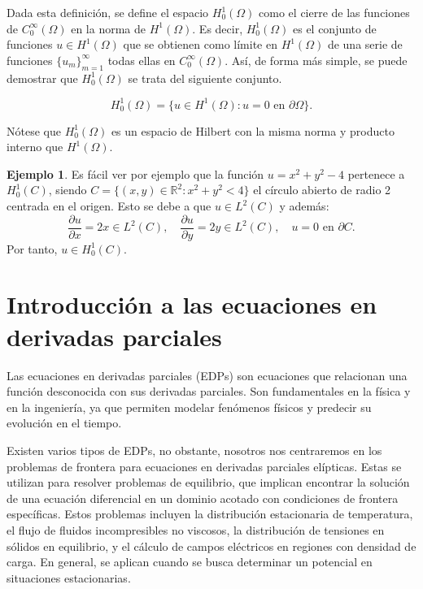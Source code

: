 \documentclass[a4paper,11pt,spanish, twoside, leqno]{tfg-uam}
\theoremstyle{definition}
\newtheorem{exmp}[teor]{Ejemplo}
\begin{document}
Dada esta definición, se define el espacio $H_0^1(\Omega)$ como el cierre de las funciones de $C_0^\infty(\Omega)$ en la norma de $H^1(\Omega)$. Es decir, $H_0^1(\Omega)$ es el conjunto de funciones $u\in H^1(\Omega)$ que se obtienen como límite en $H^1(\Omega)$ de una serie de funciones $\{u_m\}_{m=1}^\infty$ todas ellas en $C_0^\infty(\Omega)$. Así, de forma más simple, se puede demostrar que $H_0^1(\Omega)$ se trata del siguiente conjunto.

\begin{equation}
    H_0^1(\Omega)=\{u\in H^1(\Omega): u=0 \text{ en } \partial\Omega\}.
\end{equation}

Nótese que $H_0^1(\Omega)$ es un espacio de Hilbert con la misma norma y producto interno que $H^1(\Omega)$.



\begin{exmp}
    Es fácil ver por ejemplo que la función $u = x^2 + y^2 - 4$ pertenece a $H^1_0(C)$, siendo $C = \{(x,y)\in \mathbb{R}^2: x^2 + y^2 < 4\}$ el círculo abierto de radio 2 centrada en el origen. Esto se debe a que $u\in L^2(C)$ y además:
    \begin{equation*}
        \frac{\partial u}{\partial x} = 2x\in L^2(C), \quad \frac{\partial u}{\partial y} = 2y \in L^2(C), \quad u=0\text{ en  } \partial C.
    \end{equation*}
    Por tanto, $u\in H_0^1(C)$.
\end{exmp}


\section{Introducción a las ecuaciones en derivadas parciales}

Las ecuaciones en derivadas parciales (EDPs) son ecuaciones que relacionan una función desconocida con sus derivadas parciales. Son fundamentales en la física y en la ingeniería, ya que permiten modelar fenómenos físicos y predecir su evolución en el tiempo. 

Existen varios tipos de EDPs, no obstante, nosotros nos centraremos en los problemas de frontera para ecuaciones en derivadas parciales elípticas. Estas se utilizan para resolver problemas de equilibrio, que implican encontrar la solución de una ecuación diferencial en un dominio acotado con condiciones de frontera específicas. Estos problemas incluyen la distribución estacionaria de temperatura, el flujo de fluidos incompresibles no viscosos, la distribución de tensiones en sólidos en equilibrio, y el cálculo de campos eléctricos en regiones con densidad de carga. En general, se aplican cuando se busca determinar un potencial en situaciones estacionarias. 
\end{document}
